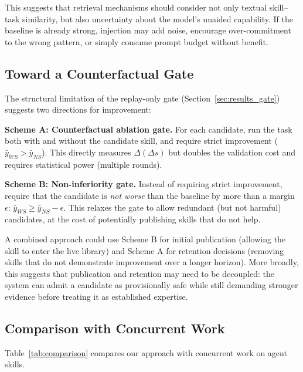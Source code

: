 ﻿\documentclass[preprint,12pt]{elsarticle}
\begin{document}
This suggests that retrieval mechanisms should consider not only textual
skill--task similarity, but also uncertainty about the model's unaided
capability.  If the baseline is already strong, injection may add noise,
encourage over-commitment to the wrong pattern, or simply consume prompt
budget without benefit.

\subsection{Toward a Counterfactual Gate}
\label{sec:counterfactual_gate}

The structural limitation of the replay-only gate
(Section~\ref{sec:results_gate}) suggests two directions for improvement:

\textbf{Scheme A: Counterfactual ablation gate.} For each candidate, run
the task both with and without the candidate skill, and require strict
improvement ($\bar{y}_{WS} > \bar{y}_{NS}$).  This directly measures
$\Delta(\Delta s)$ but doubles the validation cost and requires
statistical power (multiple rounds).

\textbf{Scheme B: Non-inferiority gate.} Instead of requiring strict
improvement, require that the candidate is \emph{not worse} than the
baseline by more than a margin $\epsilon$: $\bar{y}_{WS} \geq
\bar{y}_{NS} - \epsilon$.  This relaxes the gate to allow redundant (but
not harmful) candidates, at the cost of potentially publishing skills that
do not help.

A combined approach could use Scheme B for initial publication (allowing
the skill to enter the live library) and Scheme A for retention decisions
(removing skills that do not demonstrate improvement over a longer
horizon).  More broadly, this suggests that publication and retention may
need to be decoupled: the system can admit a candidate as provisionally
safe while still demanding stronger evidence before treating it as
established expertise.

\subsection{Comparison with Concurrent Work}

Table~\ref{tab:comparison} compares our approach with concurrent work on
agent skills.
\end{document}
